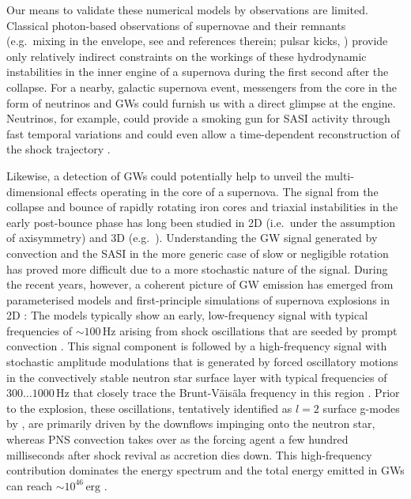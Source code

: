 Our means to validate these numerical models by observations are
limited. Classical photon-based observations of supernovae and their
remnants (e.g.\ mixing in the envelope, see
\citealp{wongwathanarat_15} and references therein; pulsar kicks,
\citealp{scheck_06,wongwathanarat_10b,wongwathanarat_13,nordhaus_12}) provide only
relatively indirect constraints on the workings of these hydrodynamic
instabilities in the inner engine of a supernova during the first
second after the collapse.  For a nearby, galactic supernova event,
messengers from the core in the form of neutrinos and GWs 
could furnish us with a direct glimpse at the engine. Neutrinos,
for example, could provide a smoking gun for SASI activity through
fast temporal variations \citep{marek_08,lund_10,brandt_11,tamborra_13,tamborra_14b,mueller_14} and
could even allow a time-dependent reconstruction of the shock trajectory
\citep{mueller_14}.

Likewise, a detection of GWs could potentially help to
unveil the multi-dimensional effects operating in the core of a
supernova. The signal from the collapse and bounce of rapidly rotating
iron cores and triaxial instabilities in the early post-bounce phase
has long been studied in 2D (i.e.\ under the assumption of
axisymmetry) and 3D
(e.g.\ \citealp{ott_06_a,dimmelmeier_07_a,dimmelmeier_08,scheidegger_08,abdikamalov_10}). Understanding
the GW signal generated by convection and the SASI in
the more generic case of slow or negligible rotation has proved more
difficult due to a more stochastic nature of the signal. During the
recent years, however, a coherent picture of GW
emission has emerged from parameterised models \citep{murphy_09} and
first-principle simulations of supernova explosions in 2D
\citep{marek_08,mueller_13}: The models typically show an early,
low-frequency signal with typical frequencies of $\mathord{\sim} 100
\,\mathrm{Hz}$ arising from shock oscillations that are seeded by
prompt convection
\citep{marek_08,murphy_09,yakunin_10,mueller_13,yakunin_15}. This
signal component is followed by a high-frequency signal with stochastic
amplitude modulations that is generated by forced oscillatory motions
in the convectively stable neutron star surface layer
\citep{marek_08,murphy_09,mueller_13} with typical frequencies of $300
\ldots 1000 \,\mathrm{Hz}$  that closely trace the
Brunt-V\"ais\"ala frequency in this region \citep{mueller_13}. Prior
to the explosion, these oscillations, tentatively identified as $l=2$
surface g-modes by \citet{mueller_13}, are primarily driven by the
downflows impinging onto the neutron star, whereas PNS
convection takes over as the forcing agent a few hundred
milliseconds after shock revival as accretion dies down.  This
high-frequency contribution dominates the energy spectrum and the
total energy emitted in GWs can reach
$\mathord{\sim} 10^{46} \,\mathrm{erg}$ \citep{mueller_13,yakunin_15}.


